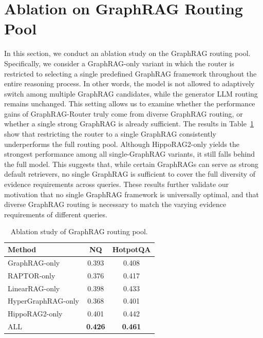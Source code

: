 \section{Ablation on GraphRAG Routing Pool}
In this section, we conduct an ablation study on the GraphRAG routing pool. Specifically, we consider a GraphRAG-only variant in which the router is restricted to selecting a single predefined GraphRAG framework throughout the entire reasoning process. In other words, the model is not allowed to adaptively switch among multiple GraphRAG candidates, while the generator LLM routing remains unchanged. This setting allows us to examine whether the performance gains of GraphRAG-Router truly come from diverse GraphRAG routing, or whether a single strong GraphRAG is already sufficient. The results in Table~\ref{tab:graph} show that restricting the router to a single GraphRAG consistently underperforms the full routing pool. Although HippoRAG2-only yields the strongest performance among all single-GraphRAG variants, it still falls behind the full model. This suggests that, while certain GraphRAGs can serve as strong default retrievers, no single GraphRAG is sufficient to cover the full diversity of evidence requirements across queries. These results further validate our motivation that no single GraphRAG framework is universally optimal, and that diverse GraphRAG routing is necessary to match the varying evidence requirements of different queries.
\begin{table}[!h]
\centering
\footnotesize
\setlength{\tabcolsep}{5pt}
\renewcommand{\arraystretch}{1.1}
\begin{tabular}{l|cc}
\toprule
\textbf{Method} & \textbf{NQ} & \textbf{HotpotQA} \\ 
\midrule
GraphRAG-only         & 0.393      & 0.408 \\
RAPTOR-only          & 0.376 & 0.417  \\
LinearRAG-only          & 0.398 & 0.433  \\
HyperGraphRAG-only          & 0.368 & 0.401 \\
HippoRAG2-only          & 0.401 & 0.442  \\
ALL          & \textbf{0.426} & \textbf{0.461}  \\
\bottomrule
\end{tabular}
\caption{Ablation study of GraphRAG routing pool.}
\label{tab:graph}
\end{table}


